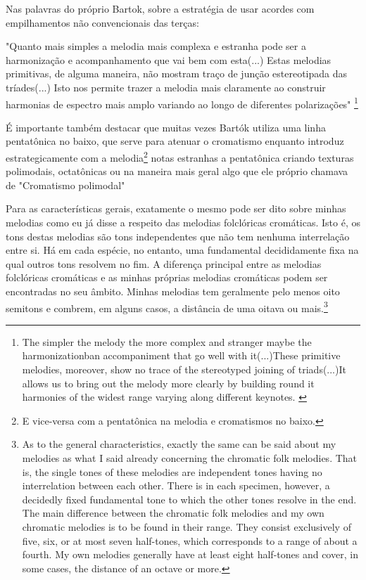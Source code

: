 \documentclass[
	12pt,				%
	openright,			%
	twoside,			%
	a4paper,			%
	english,			%
	french,				%
	spanish,			%
	brazil				%
	]{abntex2}
\begin{document}
Nas palavras do próprio Bartok, sobre a estratégia de usar acordes com empilhamentos não convencionais das terças:

\begin{citacao}
"Quanto mais simples a melodia mais complexa e estranha pode ser a harmonização e acompanhamento que vai bem com esta(...) Estas melodias primitivas, de alguma maneira, não mostram traço de junção estereotipada das tríades(...) Isto nos permite trazer a melodia mais claramente ao construir harmonias de espectro mais amplo variando ao longo de diferentes polarizações"
 \cite[p. 342]{bartok1993bela}\footnote{The simpler the melody the more complex and stranger maybe the harmonizationban accompaniment that go well with it(...)These primitive melodies, moreover, show no trace of the stereotyped joining of triads(...)It allows us to bring out the melody more clearly by building round it harmonies of the widest range varying along different keynotes. \cite[p. 342]{bartok1993bela}}
\end{citacao}


É importante também destacar que muitas vezes Bartók utiliza uma linha pentatônica no baixo, que serve para atenuar o cromatismo enquanto introduz estrategicamente com a melodia\footnote{E vice-versa com a pentatônica na melodia e cromatismos no baixo.} notas estranhas a pentatônica criando texturas polimodais, octatônicas ou na maneira mais geral algo que ele próprio chamava de "Cromatismo polimodal"\cite{antokoletz1984music}


\begin{citacao}
Para as características gerais, exatamente o mesmo pode ser dito sobre minhas melodias como eu já disse a respeito das melodias folclóricas cromáticas. Isto é, os tons destas melodias são tons independentes que não tem nenhuma interrelação entre si. Há em cada espécie, no entanto, uma fundamental decididamente fixa na qual outros tons resolvem no fim. A diferença principal entre as melodias folclóricas cromáticas e as minhas próprias melodias cromáticas podem ser encontradas no seu âmbito. Minhas melodias tem geralmente pelo menos oito semitons e combrem, em alguns casos, a distância de uma oitava ou mais.\cite[p. 381]{bartok1993bela}\footnote{
As to the general characteristics, exactly the same can be said about my melodies as what I said already concerning the chromatic folk melodies. That is, the single tones of these melodies are independent tones having no interrelation between each other. There is in each specimen, however, a decidedly fixed fundamental tone to which the other tones resolve in the end. The main difference between the chromatic folk melodies and my own chromatic melodies is to be found in their range. They consist exclusively of five, six, or at most seven half-tones, which corresponds to a range of about a fourth. My own melodies generally have at least eight half-tones and cover, in some cases, the distance of an octave or more.\cite[p. 381]{bartok1993bela}}
\end{citacao}
\end{document}
